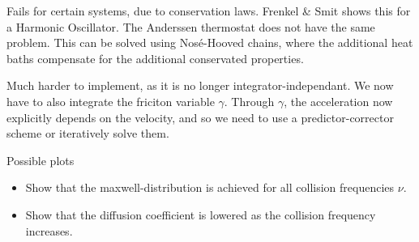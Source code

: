 \documentclass[a4paper, 11pt, notitlepage, english]{article}
\begin{document}
Fails for certain systems, due to conservation laws. Frenkel \& Smit shows this for a Harmonic Oscillator. The Anderssen thermostat does not have the same problem. This can be solved using Nosé-Hooved chains, where the additional heat baths compensate for the additional conservated properties.

Much harder to implement, as it is no longer integrator-independant. We now have to also integrate the friciton variable $\gamma$. Through $\gamma$, the acceleration now explicitly depends on the velocity, and so we need to use a predictor-corrector scheme or iteratively solve them.

\clearpage

Possible plots
\begin{itemize}
	\item Show that the maxwell-distribution is achieved for all collision frequencies $\nu$.
	\item Show that the diffusion coefficient is lowered as the collision frequency increases.
\end{itemize}

\clearpage
\end{document}
